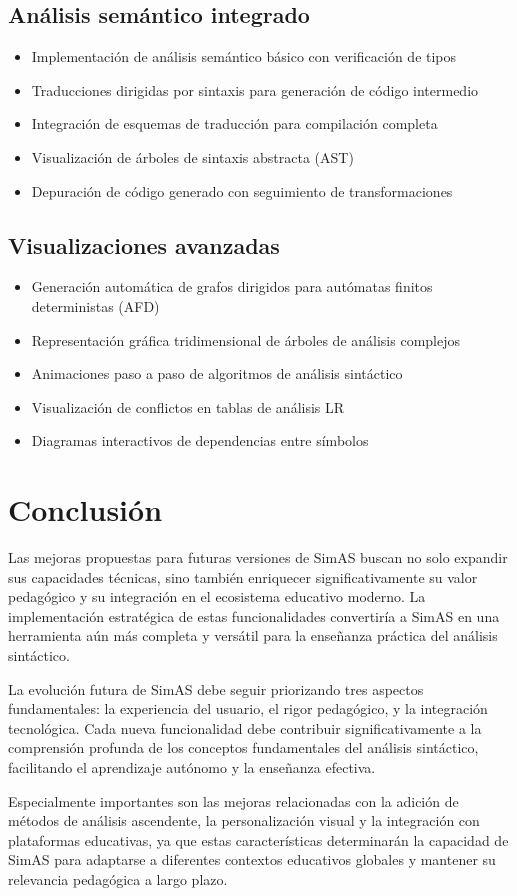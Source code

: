 \subsection{Análisis semántico integrado}

\begin{itemize}
 \item Implementación de análisis semántico básico con verificación de tipos
 \item Traducciones dirigidas por sintaxis para generación de código intermedio
 \item Integración de esquemas de traducción para compilación completa
 \item Visualización de árboles de sintaxis abstracta (AST)
 \item Depuración de código generado con seguimiento de transformaciones
\end{itemize}

\subsection{Visualizaciones avanzadas}

\begin{itemize}
 \item Generación automática de grafos dirigidos para autómatas finitos deterministas (AFD)
 \item Representación gráfica tridimensional de árboles de análisis complejos
 \item Animaciones paso a paso de algoritmos de análisis sintáctico
 \item Visualización de conflictos en tablas de análisis LR
 \item Diagramas interactivos de dependencias entre símbolos
\end{itemize}

\section{Conclusión}

Las mejoras propuestas para futuras versiones de SimAS buscan no solo expandir sus capacidades técnicas, sino también enriquecer significativamente su valor pedagógico y su integración en el ecosistema educativo moderno. La implementación estratégica de estas funcionalidades convertiría a SimAS en una herramienta aún más completa y versátil para la enseñanza práctica del análisis sintáctico.

La evolución futura de SimAS debe seguir priorizando tres aspectos fundamentales: la experiencia del usuario, el rigor pedagógico, y la integración tecnológica. Cada nueva funcionalidad debe contribuir significativamente a la comprensión profunda de los conceptos fundamentales del análisis sintáctico, facilitando el aprendizaje autónomo y la enseñanza efectiva.

Especialmente importantes son las mejoras relacionadas con la adición de métodos de análisis ascendente, la personalización visual y la integración con plataformas educativas, ya que estas características determinarán la capacidad de SimAS para adaptarse a diferentes contextos educativos globales y mantener su relevancia pedagógica a largo plazo.